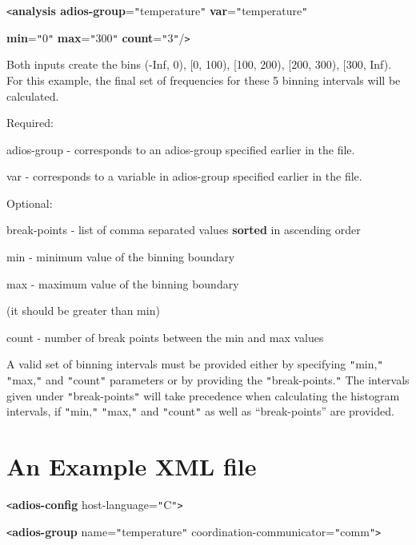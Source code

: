 \leftskip=99pt
\parindent=-63pt
\texttt{<}\textbf{analysis adios-group}=\texttt{"}temperature\texttt{"}    \textbf{var}=\texttt{"}temperature\texttt{"}

\textbf{min}=\texttt{"}0\texttt{"}    \textbf{max}=\texttt{"}300\texttt{"}    \textbf{count}=\texttt{"}3\texttt{"}/\texttt{>}

\leftskip=0pt
\parindent=0pt
Both inputs create the bins (-Inf, 0), [0, 100), [100, 200), [200, 300), [300, 
Inf). For this example, the final set of frequencies for these 5 binning intervals 
will be calculated.

Required:

\leftskip=76pt
\parindent=-54pt
adios-group - corresponds to an adios-group specified earlier in the file.

var - corresponds to a variable in adios-group specified earlier in the file.

\leftskip=0pt
\parindent=0pt
Optional:

\leftskip=36pt
\parindent=-18pt
break-points - list of comma separated values \textbf{sorted} in ascending order

\parindent=-3pt
min  - minimum value of the binning boundary

\parindent=-18pt
max - maximum value of the binning boundary 

(it should be greater than min)

count - number of break points between the min and max values 

\leftskip=0pt
\parindent=0pt
A valid set of binning intervals must be provided either by specifying \texttt{"}min,\texttt{"} 
\texttt{"}max,\texttt{"} and \texttt{"}count\texttt{"} parameters or by providing 
the \texttt{"}break-points.\texttt{"} The intervals given under \texttt{"}break-points\texttt{"} 
will take precedence when calculating the histogram intervals, if \texttt{"}min,\texttt{"} 
\texttt{"}max,\texttt{"} and \texttt{"}count\texttt{"} as well as ``break-points'' 
are provided.\pagebreak{}\label{HToc182553378}

\section*{{\large \textbf{An Example XML file}}}


\texttt{<}\textbf{adios-config} host-language=\texttt{"}C\texttt{"}\texttt{>}

\parindent=14pt
\texttt{<}\textbf{adios-group} name=\texttt{"}temperature\texttt{"} coordination-communicator=\texttt{"}comm\texttt{"}\texttt{>}

